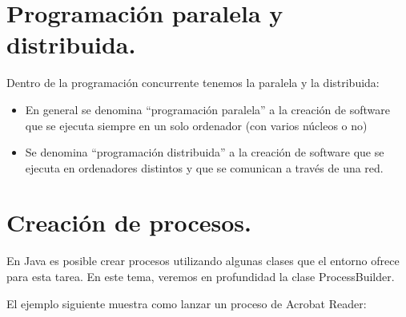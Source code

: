 \documentclass[a4paper,12pt,spanish]{sphinxmanual}
\begin{document}
\section{Programación paralela y distribuida.}
\label{textos/tema1:programacion-paralela-y-distribuida}
Dentro de la programación concurrente tenemos la paralela y la distribuida:
\begin{itemize}
\item {} 
En general se denomina ``programación paralela'' a la creación de software que se ejecuta siempre en un solo ordenador (con varios núcleos o no)

\item {} 
Se denomina ``programación distribuida'' a la creación de software que se ejecuta en ordenadores distintos y que se comunican a través de una red.

\end{itemize}


\section{Creación de procesos.}
\label{textos/tema1:creacion-de-procesos}
En Java es posible crear procesos utilizando algunas clases que el entorno ofrece para esta tarea. En este tema, veremos en profundidad la clase ProcessBuilder.

El ejemplo siguiente muestra como lanzar un proceso de Acrobat Reader:
\end{document}
